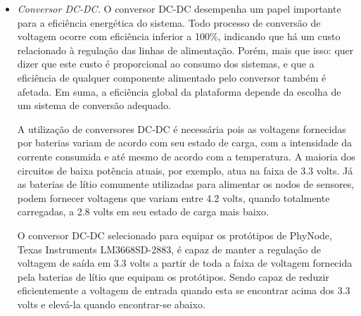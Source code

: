 \documentclass[
	12pt,				%
	openright,			%
	oneside,
	a4paper,			%
	english,			%
	french,				%
	spanish,			%
	brazil				%
	]{abntex2}
\begin{document}
\begin{itemize}
	A Maxim Integrated\texttrademark alega, no entanto, que este sistema, apesar de apresentar resultados mais precisos a curto prazo, apresenta problemas de precisão a longo prazo. Isto se deve, principalmente, às tolerâncias de certos componentes do circuito utilizado para aferição da corrente (mais precisamente um resistor \textit{shunt} que não pode ser integrado ao \textit{chip}, e o traçado das trilhas na placa de circuito impresso). O segundo algoritmo, nomeado ModelGauge\texttrademark, é um algoritmo proprietário desenvolvido pelo fabricante, baseado somente no monitoramento da voltagem da bateria, que é alegadamente mais preciso a longo prazo.
	
	As leituras fornecidas pelo MAX17047 combinam resultados obtidos a partir destes dois algoritmos com fatores de compensação adicionais que dizem respeito a temperatura e ao envelhecimento da bateria. Através deste chip é possível ainda monitorar outros parâmetros do sistema como: consumo instantâneo e o tempo restante para o carregamento ou descarregamento completo da bateria.
	\item \textit{Conversor DC-DC.} O conversor DC-DC desempenha um papel importante para a eficiência energética do sistema. Todo processo de conversão de voltagem ocorre com eficiência inferior a 100\%, indicando que há um custo relacionado à regulação das linhas de alimentação. Porém, mais que isso: quer dizer que este custo é proporcional ao consumo dos sistemas, e que a eficiência de qualquer componente alimentado pelo conversor também é afetada. Em suma, a eficiência global da plataforma depende da escolha de um sistema de conversão adequado.
	
	A utilização de conversores DC-DC é necessária pois as voltagens fornecidas por baterias variam de acordo com seu estado de carga, com a intensidade da corrente consumida e até mesmo de acordo com a temperatura. A maioria dos circuitos de baixa potência atuais, por exemplo, atua na faixa de 3.3 volts. Já as baterias de lítio comumente utilizadas para alimentar os nodos de sensores, podem fornecer voltagens que variam entre 4.2 volts, quando totalmente carregadas, a 2.8 volts em seu estado de carga mais baixo.
	
	O conversor DC-DC selecionado para equipar os protótipos de PhyNode, Texas Instruments LM3668SD-2883, é capaz de manter a regulação de voltagem de saída em 3.3 volts a partir de toda a faixa de voltagem fornecida pela baterias de lítio que equipam os protótipos. Sendo capaz de reduzir eficientemente a voltagem de entrada quando esta se encontrar acima dos 3.3 volts e elevá-la quando encontrar-se abaixo.
\end{itemize}
\end{document}
